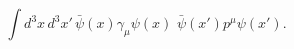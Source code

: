 \begin{equation}
\int d^3x\,d^3x' \, \bar{\psi}(x)\gamma_\mu \psi(x) \,\, 
\bar{\psi}(x') p^\mu \psi(x') . \label{4-2}
\end{equation}

